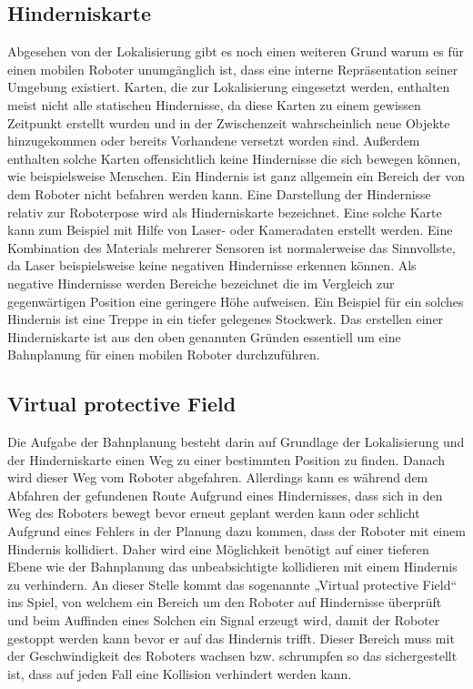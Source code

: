\subsection{Hinderniskarte}
Abgesehen von der Lokalisierung gibt es noch einen weiteren Grund warum es für einen mobilen Roboter unumgänglich ist,
 dass eine interne Repräsentation seiner Umgebung existiert. Karten, die zur Lokalisierung eingesetzt werden,
 enthalten meist nicht alle statischen Hindernisse, da diese Karten zu einem gewissen Zeitpunkt erstellt wurden und
 in der Zwischenzeit wahrscheinlich neue Objekte hinzugekommen oder bereits Vorhandene versetzt worden sind.
 Außerdem enthalten solche Karten offensichtlich keine Hindernisse die sich bewegen können, wie beispielsweise Menschen.
 Ein Hindernis ist ganz allgemein ein Bereich der von dem Roboter nicht befahren werden kann. Eine Darstellung der Hindernisse
 relativ zur Roboterpose wird als Hinderniskarte bezeichnet. Eine solche Karte
 kann zum Beispiel mit Hilfe von Laser- oder Kameradaten erstellt werden.
 Eine Kombination des Materials mehrerer Sensoren ist normalerweise das Sinnvollste,
 da Laser beispielsweise keine negativen Hindernisse erkennen können.
 Als negative Hindernisse werden Bereiche bezeichnet die im Vergleich zur
 gegenwärtigen Position eine geringere Höhe aufweisen.
 Ein Beispiel für ein solches Hindernis ist eine Treppe in ein tiefer gelegenes
 Stockwerk. Das erstellen einer Hinderniskarte ist aus den oben genannten
 Gründen essentiell um eine Bahnplanung für einen mobilen Roboter durchzuführen.
\subsection{Virtual protective Field}
Die Aufgabe der Bahnplanung besteht darin auf Grundlage der Lokalisierung und der Hinderniskarte einen Weg zu einer
 bestimmten Position zu finden. Danach wird dieser Weg vom Roboter abgefahren. Allerdings kann es während dem Abfahren der gefundenen
 Route Aufgrund eines Hindernisses, dass sich in den Weg des Roboters bewegt bevor erneut geplant werden kann oder
 schlicht Aufgrund eines Fehlers in der Planung dazu kommen, dass der Roboter mit einem Hindernis kollidiert.
 Daher wird eine Möglichkeit benötigt auf einer tieferen Ebene wie der Bahnplanung das unbeabsichtigte kollidieren mit einem Hindernis
 zu verhindern. An dieser Stelle kommt das sogenannte „Virtual protective Field“ ins Spiel, von welchem ein Bereich um den Roboter auf
 Hindernisse überprüft und beim Auffinden eines Solchen ein Signal erzeugt wird, damit der Roboter gestoppt werden kann bevor er
 auf das Hindernis trifft. Dieser Bereich muss mit der Geschwindigkeit des
 Roboters wachsen bzw. schrumpfen so das sichergestellt ist, dass auf jeden
 Fall eine Kollision verhindert werden kann.
